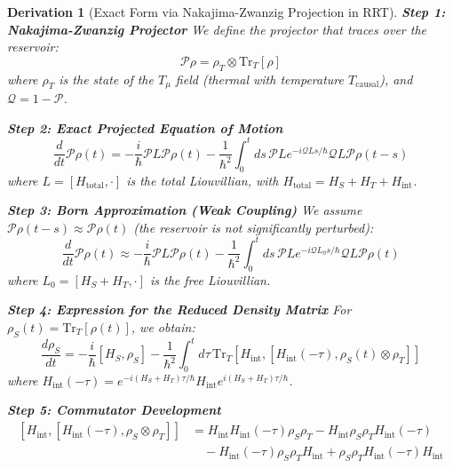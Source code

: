 \documentclass[10pt, a4paper]{article}
\newcommand{\Tr}{\text{Tr}}
\newtheorem{derivation}{Derivation}
\begin{document}
\begin{derivation}[Exact Form via Nakajima-Zwanzig Projection in RRT]
\textbf{Step 1: Nakajima-Zwanzig Projector}
We define the projector that traces over the reservoir:
\begin{equation}
\mathcal{P} \rho = \rho_T \otimes \Tr_T[\rho]
\tag{25.1}
\end{equation}
where $\rho_T$ is the state of the $T_\mu$ field (thermal with temperature $T_{\text{causal}}$), and $\mathcal{Q} = 1 - \mathcal{P}$.

\textbf{Step 2: Exact Projected Equation of Motion}
\begin{equation}
\frac{d}{dt} \mathcal{P}\rho(t) = -\frac{i}{\hbar} \mathcal{P}L \mathcal{P}\rho(t) - \frac{1}{\hbar^2} \int_0^t ds \, \mathcal{P}L e^{-i\mathcal{Q}L s/\hbar} \mathcal{Q}L \mathcal{P}\rho(t-s)
\tag{25.2}
\end{equation}
where $L = [H_{\text{total}}, \cdot]$ is the total Liouvillian, with $H_{\text{total}} = H_S + H_T + H_{\text{int}}$.

\textbf{Step 3: Born Approximation (Weak Coupling)}
We assume $\mathcal{P}\rho(t-s) \approx \mathcal{P}\rho(t)$ (the reservoir is not significantly perturbed):
\begin{equation}
\frac{d}{dt} \mathcal{P}\rho(t) \approx -\frac{i}{\hbar} \mathcal{P}L \mathcal{P}\rho(t) - \frac{1}{\hbar^2} \int_0^t ds \, \mathcal{P}L e^{-i\mathcal{Q}L_0 s/\hbar} \mathcal{Q}L \mathcal{P}\rho(t)
\tag{25.3}
\end{equation}
where $L_0 = [H_S + H_T, \cdot]$ is the free Liouvillian.

\textbf{Step 4: Expression for the Reduced Density Matrix}
For $\rho_S(t) = \Tr_T[\rho(t)]$, we obtain:
\begin{equation}
\frac{d\rho_S}{dt} = -\frac{i}{\hbar}[H_S, \rho_S] - \frac{1}{\hbar^2} \int_0^t d\tau \, \Tr_T \left[ H_{\text{int}}, [H_{\text{int}}(-\tau), \rho_S(t) \otimes \rho_T] \right]
\tag{25.4}
\end{equation}
where $H_{\text{int}}(-\tau) = e^{-i(H_S+H_T)\tau/\hbar} H_{\text{int}} e^{i(H_S+H_T)\tau/\hbar}$.

\textbf{Step 5: Commutator Development}
\begin{align}
\left[ H_{\text{int}}, [H_{\text{int}}(-\tau), \rho_S \otimes \rho_T] \right] &= H_{\text{int}} H_{\text{int}}(-\tau) \rho_S \rho_T - H_{\text{int}} \rho_S \rho_T H_{\text{int}}(-\tau) \\
&\quad - H_{\text{int}}(-\tau) \rho_S \rho_T H_{\text{int}} + \rho_S \rho_T H_{\text{int}}(-\tau) H_{\text{int}}
\tag{25.5}
\end{align}


\end{derivation}
\end{document}
